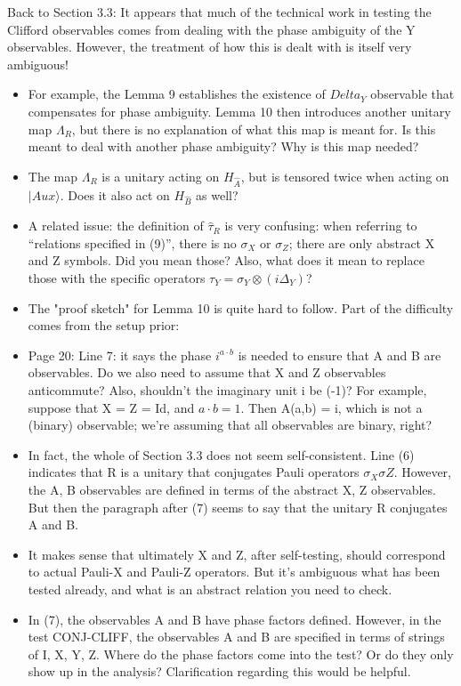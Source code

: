 \documentclass[12pt]{article}
\newcommand{\ket}[1]{|#1\rangle}
\begin{document}
Back to Section 3.3: It appears that much of the technical work in testing the Clifford observables comes from dealing with the phase ambiguity of the Y observables. However, the treatment of how this is dealt with is itself very ambiguous!
\begin{itemize}
\item For example, the Lemma 9 establishes the existence of $Delta_Y$ observable that compensates for phase ambiguity. Lemma 10 then introduces another unitary map $\Lambda_R$, but there is no explanation of what this map is meant for. Is this meant to deal with another phase ambiguity? Why is this map needed?
\item The map $\Lambda_R$ is a unitary acting on $H_{\hat{A}}$, but is tensored twice when acting on $\ket{Aux}$. Does it also act on $H_{\hat{B}}$ as well? 
\item A related issue: the definition of $\hat{\tau}_R$ is very confusing: when referring to “relations specified in (9)”, there is no $\sigma_X$ or $\sigma_Z$; there are only abstract X and Z symbols. Did you mean those? Also, what does it mean to replace those with the specific operators $\tau_Y = \sigma_Y \otimes (i \Delta_Y)$? 
\item The "proof sketch" for Lemma 10 is quite hard to follow. Part of the difficulty comes from the setup prior:
\item 
Page 20: Line 7: it says the phase $i^{a \cdot b}$ is needed to ensure that A and B are observables. Do we also need to assume that X and Z observables anticommute? Also, shouldn’t the imaginary unit i be (-1)? For example, suppose that X = Z = Id, and $a \cdot b = 1$. Then A(a,b) = i, which is not a (binary) observable; we’re assuming that all observables are binary, right?
\item 
In fact, the whole of Section 3.3 does not seem self-consistent. Line (6) indicates that R is a unitary that conjugates Pauli operators $\sigma_X \sigma Z$. However, the A, B observables are defined in terms of the abstract X, Z observables. But then the paragraph after (7) seems to say that the unitary R conjugates A and B. 
\item 
It makes sense that ultimately X and Z, after self-testing, should correspond to actual Pauli-X and Pauli-Z operators. But it’s ambiguous what has been tested already, and what is an abstract relation you need to check. 
\item 
In (7), the observables A and B have phase factors defined. However, in the test CONJ-CLIFF, the observables A and B are specified in terms of strings of I, X, Y, Z. Where do the phase factors come into the test? Or do they only show up in the analysis? Clarification regarding this would be helpful.
\end{itemize}
\end{document}
